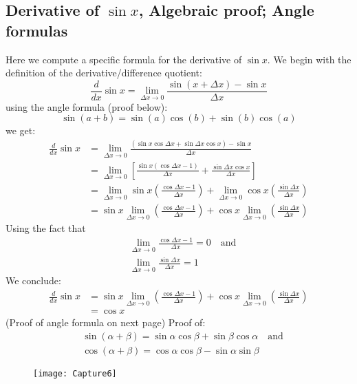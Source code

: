 \documentclass{report}
\begin{document}
\subsection{Derivative of $\sin x$, Algebraic proof; Angle formulas} %
Here we compute a specific formula for the derivative of $\sin x$. We begin with the
definition of the derivative/difference quotient:
\begin{equation*}
\frac{d}{dx}\sin x=\lim_{\Delta x\to 0}\frac{\sin(x+\Delta x)-\sin x}{\Delta x}
\end{equation*}
using the angle formula (proof below):
\begin{equation*}
\sin(a+b)=\sin(a)\cos(b)+\sin(b)\cos(a)
\end{equation*}
we get:
\begin{align*}
\frac{d}{dx}\sin x&=\lim_{\Delta x\to 0}\frac{(\sin x\cos\Delta x+\sin\Delta x\cos x)-\sin x}
{\Delta x}\\
&=\lim_{\Delta x\to 0}\left[\frac{\sin x(\cos\Delta x-1)}{\Delta x}+
\frac{\sin\Delta x\cos x}{\Delta x}\right]\\
&=\lim_{\Delta x\to 0}\sin x\left(\frac{\cos\Delta x-1}{\Delta x}\right)+
\lim_{\Delta x\to 0}\cos x\left(\frac{\sin\Delta x}{\Delta x}\right)\\
&=\sin x\lim_{\Delta x\to 0}\left(\frac{\cos\Delta x-1}{\Delta x}\right)
+\cos x\lim_{\Delta x\to 0}\left(\frac{\sin\Delta x}{\Delta x}\right)
\end{align*}
Using the fact that
\begin{align*}
&\lim_{\Delta x\to 0}\frac{\cos\Delta x-1}{\Delta x}=0\quad\text{and}\\
&\lim_{\Delta x\to 0}\frac{\sin\Delta x}{\Delta x}=1
\end{align*}
We conclude:
\begin{align*}
\frac{d}{dx}\sin x&=\sin x\lim_{\Delta x\to 0}\left(\frac{\cos\Delta x-1}{\Delta x}\right)
+\cos x\lim_{\Delta x\to 0}\left(\frac{\sin\Delta x}{\Delta x}\right)\\
&=\cos x
\end{align*}
(Proof of angle formula on next page)
\newpage
Proof of:
\begin{align*}
&\sin(\alpha+\beta)=\sin\alpha\cos\beta+\sin\beta\cos\alpha\quad\text{and}\\
&\cos(\alpha+\beta)=\cos\alpha\cos\beta-\sin\alpha\sin\beta
\end{align*}
\begin{figure}[h]
\texttt{[image: Capture6]}
\centering
\end{figure}
\newpage
\end{document}
